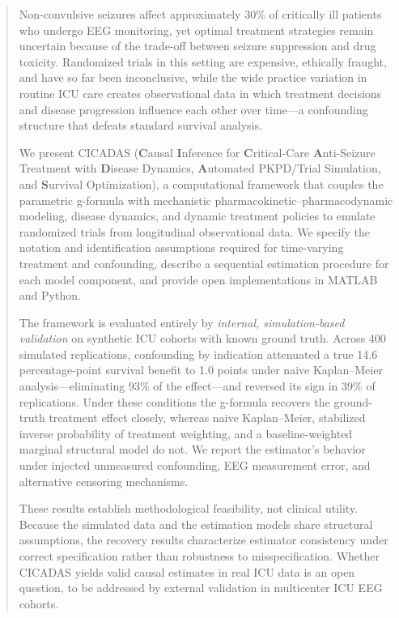 \begin{abstract}
Non-convulsive seizures affect approximately 30\% of critically ill patients who undergo EEG
monitoring, yet optimal treatment strategies remain uncertain because of the trade-off between
seizure suppression and drug toxicity. Randomized trials in this setting are expensive, ethically
fraught, and have so far been inconclusive, while the wide practice variation in routine ICU care
creates observational data in which treatment decisions and disease progression influence each other
over time---a confounding structure that defeats standard survival analysis.

We present CICADAS (\textbf{C}ausal \textbf{I}nference for \textbf{C}ritical-Care
\textbf{A}nti-Seizure Treatment with \textbf{D}isease Dynamics, \textbf{A}utomated PKPD/Trial
Simulation, and \textbf{S}urvival Optimization), a computational framework that couples the
parametric g-formula with mechanistic pharmacokinetic--pharmacodynamic modeling, disease dynamics,
and dynamic treatment policies to emulate randomized trials from longitudinal observational data. We
specify the notation and identification assumptions required for time-varying treatment and
confounding, describe a sequential estimation procedure for each model component, and provide open
implementations in MATLAB and Python.

The framework is evaluated entirely by \emph{internal, simulation-based validation} on synthetic ICU
cohorts with known ground truth. Across 400 simulated replications, confounding by indication
attenuated a true 14.6 percentage-point survival benefit to 1.0 points under naive Kaplan--Meier
analysis---eliminating 93\% of the effect---and reversed its sign in 39\% of replications. Under
these conditions the g-formula recovers the ground-truth treatment effect closely, whereas naive
Kaplan--Meier, stabilized inverse probability of treatment weighting, and a baseline-weighted
marginal structural model do not. We report the estimator's
behavior under injected unmeasured confounding, EEG measurement error, and alternative censoring
mechanisms.

These results establish methodological feasibility, not clinical utility. Because the simulated data
and the estimation models share structural assumptions, the recovery results characterize estimator
consistency under correct specification rather than robustness to misspecification. Whether CICADAS
yields valid causal estimates in real ICU data is an open question, to be addressed by external
validation in multicenter ICU EEG cohorts.
\end{abstract}
